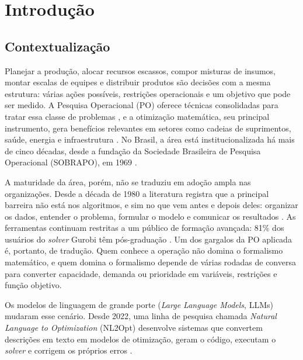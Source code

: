 \chapter{Introdução}

\section{Contextualização}

Planejar a produção, alocar recursos escassos, compor misturas de insumos, montar escalas de equipes e distribuir produtos são decisões com a mesma estrutura: várias ações possíveis, restrições operacionais e um objetivo que pode ser medido. A Pesquisa Operacional (PO) oferece técnicas consolidadas para tratar essa classe de problemas \cite{arenales2007}, e a otimização matemática, seu principal instrumento, gera benefícios relevantes em setores como cadeias de suprimentos, saúde, energia e infraestrutura \cite{wasserkrug2025}. No Brasil, a área está institucionalizada há mais de cinco décadas, desde a fundação da Sociedade Brasileira de Pesquisa Operacional (SOBRAPO), em 1969 \cite{muller2018}.

A maturidade da área, porém, não se traduziu em adoção ampla nas organizações. Desde a década de 1980 a literatura registra que a principal barreira não está nos algoritmos, e sim no que vem antes e depois deles: organizar os dados, entender o problema, formular o modelo e comunicar os resultados \cite{henderson1980, fourer2012}. As ferramentas continuam restritas a um público de formação avançada: 81\% dos usuários do \textit{solver} Gurobi têm pós-graduação \cite{ahmaditeshnizi2026}. Um dos gargalos da PO aplicada é, portanto, de tradução. Quem conhece a operação não domina o formalismo matemático, e quem domina o formalismo depende de várias rodadas de conversa para converter capacidade, demanda ou prioridade em variáveis, restrições e função objetivo.

Os modelos de linguagem de grande porte (\textit{Large Language Models}, LLMs) mudaram esse cenário. Desde 2022, uma linha de pesquisa chamada \textit{Natural Language to Optimization} (NL2Opt) desenvolve sistemas que convertem descrições em texto em modelos de otimização, geram o código, executam o \textit{solver} e corrigem os próprios erros \cite{ramamonjison2023, ahmaditeshnizi2026, monteiro2026}.

